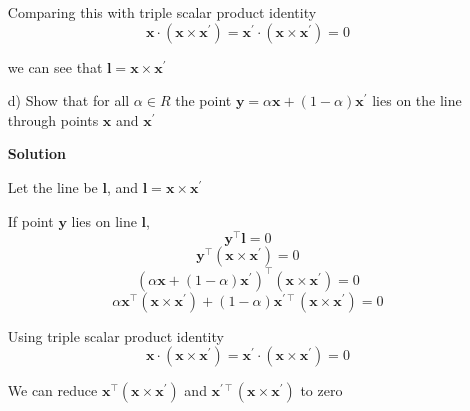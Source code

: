 \documentclass[a4paper,12pt]{article}
\begin{document}
\begin{itemize}
Comparing this with triple scalar product identity $$\mathbf{x} \cdot (\mathbf{x}\times \mathbf{x}^\prime ) = \mathbf{x}^\prime \cdot (\mathbf{x}\times \mathbf{x}^\prime) = 0$$	

we can see that $\mathbf{l} = \mathbf{x} \times \mathbf{x}^\prime$

\item[d)] Show that for all $\alpha \in R$ the point $\mathbf{y} = \alpha \mathbf{x} + (1 - \alpha)\mathbf{x}^\prime$
lies on the line through points $\mathbf{x}$ and $\mathbf{x}^\prime$

\textbf{Solution}

Let the line be $\mathbf{l}$, and $\mathbf{l} = \mathbf{x} \times \mathbf{x}^\prime$

If point $\mathbf{y}$ lies on line $\mathbf{l}$,
$$\mathbf{y}^\intercal \mathbf{l} = 0$$
$$\mathbf{y}^\intercal (\mathbf{x} \times \mathbf{x}^\prime) = 0$$
$$( \alpha \mathbf{x} + (1 - \alpha)\mathbf{x}^\prime)
^\intercal (\mathbf{x} \times \mathbf{x}^\prime) = 0$$
$$\alpha \mathbf{x}^\intercal (\mathbf{x} \times \mathbf{x}^\prime) + (1 - \alpha)\mathbf{x}^{\prime \intercal} (\mathbf{x} \times \mathbf{x}^\prime) = 0$$

Using triple scalar product identity $$\mathbf{x} \cdot (\mathbf{x}\times \mathbf{x}^\prime ) = \mathbf{x}^\prime \cdot (\mathbf{x}\times \mathbf{x}^\prime) = 0$$

We can reduce $\mathbf{x}^{\intercal} (\mathbf{x} \times \mathbf{x}^\prime)$ and
$\mathbf{x}^{\prime \intercal} (\mathbf{x} \times \mathbf{x}^\prime)$ to zero

\end{itemize} 
\end{document}
